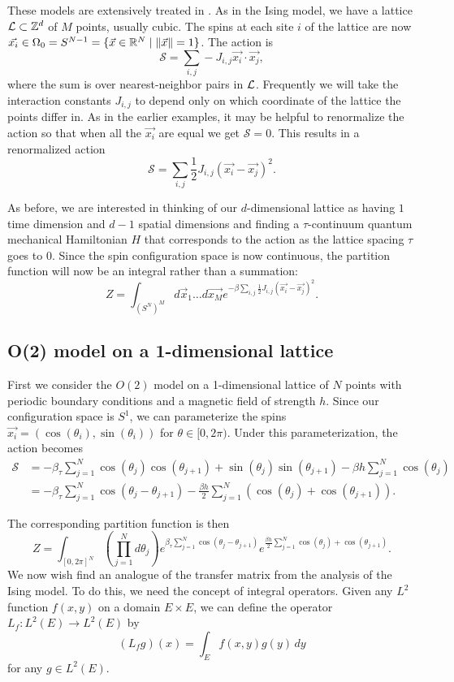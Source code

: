 \documentclass[10pt,reqno]{amsart}
\begin{document}
	These models are extensively treated in \cite{FradkinSusskind78,HamerKogutSusskind79,KogutGaugeSummary}. 
	As in the Ising model, we have a lattice $\mathcal{L} \subset \mathbb{Z}^d$ of $M$ points, usually cubic. 
	The spins at each site $i$ of the lattice are now $\vec{x_i} \in \Omega_0=S^{N-1} = \{\vec{x} \in \mathbb{R}^{N} \mid \|\vec{x}\|=1 \}$. 
	The action is
	\[\mathcal{S}=\sum_{i,j} -J_{i,j}\vec{x_i}\cdot\vec{x_j}, \] where the sum is over nearest-neighbor pairs in $\mathcal{L}$.
	Frequently we will take the interaction constants $J_{i,j}$ to depend only on which coordinate of the lattice the points differ in.
	As in the earlier examples, it may be helpful to renormalize the action so that when all the $\vec{x_i}$ are equal we get $\mathcal{S}=0$. 
	This results in a renormalized action
	\[\mathcal{S}=\sum_{i,j}\frac{1}{2} J_{i,j}(\vec{x_i}-\vec{x_j})^2. \]
	
	As before, we are interested in thinking of our $d$-dimensional lattice as having $1$ time dimension and $d-1$ spatial dimensions and finding a $\tau$-continuum quantum mechanical Hamiltonian $H$ that corresponds to the action as the lattice spacing $\tau$ goes to $0$.
	Since the spin configuration space is now continuous, the partition function will now be an integral rather than a summation:
	\[ Z=\int_{(S^N)^M} d\vec{x}_1\ldots d\vec{x_M} e^{-\beta\sum_{i,j}\frac{1}{2} J_{i,j}(\vec{x_i}-\vec{x_j})^2}. \]
	
	\subsection{O(2) model on a 1-dimensional lattice}
	
	First we consider the $O(2)$ model on a 1-dimensional lattice of $N$ points with periodic boundary conditions and a magnetic field of strength $h$.
	Since our configuration space is $S^1$, we can parameterize the spins $\vec{x_i}=(\cos(\theta_i),\sin(\theta_i))$ for $\theta \in [0,2\pi)$. 
	Under this parameterization, the action becomes
	\begin{align*}
		 \mathcal{S} &= -\beta_\tau \sum_{j=1}^N \cos(\theta_j)\cos(\theta_{j+1})+\sin(\theta_j)\sin(\theta_{j+1}) - \beta h  \sum_{j=1}^N \cos(\theta_j)\\
			&=  - \beta_\tau \sum_{j=1}^N \cos(\theta_j-\theta_{j+1}) - \frac{\beta h}{2}  \sum_{j=1}^N \left(\cos(\theta_j)+\cos(\theta_{j+1})\right). 
	\end{align*}
	
	The corresponding partition function is then
	\[ Z = \int_{[0,2\pi]^N} \left(\prod_{j=1}^N d\theta_j \right) e^{\beta_\tau \sum_{j=1}^N \cos(\theta_j-\theta_{j+1})} e^{\frac{\beta h}{2}  \sum_{j=1}^N \cos(\theta_j)+\cos(\theta_{j+1})}. \]
	We now wish find an analogue of the transfer matrix from the analysis of the Ising model.
	To do this, we need the concept of integral operators.
	Given any $L^2$ function $f(x,y)$ on a domain $E\times E$, we can define the operator $L_f : L^2(E) \to L^2(E)$ by 
	\[(L_f g)(x)=\int_E f(x,y)g(y)\, dy \]
	for any $g \in L^2(E)$.
	
\end{document}
